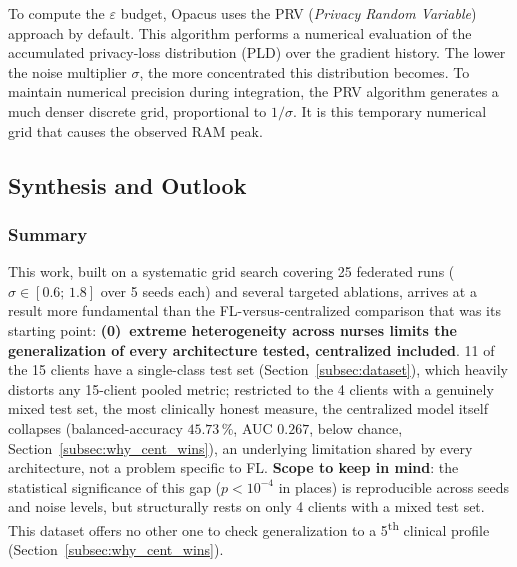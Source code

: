 \documentclass{article}
\begin{document}
To compute the $\varepsilon$ budget, Opacus uses the PRV (\textit{Privacy Random
Variable}) approach by default. This algorithm performs a numerical evaluation of
the accumulated privacy-loss distribution (PLD) over the gradient history. The
lower the noise multiplier $\sigma$, the more concentrated this distribution
becomes. To maintain numerical precision during integration, the PRV algorithm
generates a much denser discrete grid, proportional to $1/\sigma$. It is this
temporary numerical grid that causes the observed RAM peak.

\subsection{Synthesis and Outlook}
\label{subsec:synthesis}

\subsubsection{Summary}

This work, built on a systematic grid search covering 25 federated runs
($\sigma \in [0.6;\, 1.8]$ over 5 seeds each) and several targeted ablations,
arrives at a result more fundamental than the FL-versus-centralized comparison
that was its starting point: \textbf{(0)~extreme heterogeneity across nurses
limits the generalization of every architecture tested, centralized included}.
11 of the 15 clients have a single-class test set (Section~\ref{subsec:dataset}),
which heavily distorts any 15-client pooled metric; restricted to the 4 clients
with a genuinely mixed test set, the most clinically honest measure, the
centralized model itself collapses (balanced-accuracy $45.73\,\%$, AUC $0.267$,
below chance, Section~\ref{subsec:why_cent_wins}), an underlying limitation
shared by every architecture, not a problem specific to FL. \textbf{Scope to
keep in mind}: the statistical significance of this gap ($p<10^{-4}$ in places)
is reproducible across seeds and noise levels, but structurally rests on only 4
clients with a mixed test set. This dataset offers no other one to check
generalization to a 5\textsuperscript{th} clinical profile
(Section~\ref{subsec:why_cent_wins}).
\end{document}
